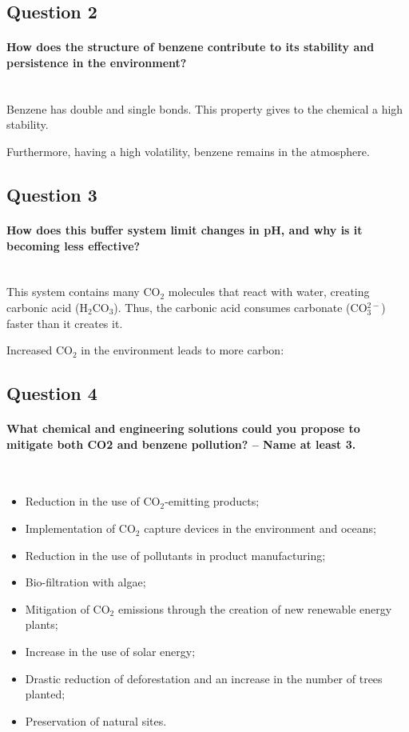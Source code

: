 \documentclass{article}
\newcommand{\figbox}[1]{ 
    \begin{figure}[ht!]        
        \begin{center}            
            \fbox{#1}        
        \end{center}    
    \end{figure}
}
\newcommand{\pph}[1]{\paragraph{#1}\phantom{}\\}
\begin{document}
\subsection{Question 2}
\pph{How does the structure of benzene contribute to its stability and persistence in the environment?}

Benzene has double and single bonds. This property gives to the chemical a high stability.

Furthermore, having a high volatility, benzene remains in the atmosphere.

\newpage
\subsection{Question 3}
\pph{How does this buffer system limit changes in pH, and why is it becoming less effective?}

This system contains many CO$_2$ molecules that react with water, creating carbonic acid
(H$_2$CO$_3$). Thus, the carbonic acid consumes carbonate (CO$_3^{2-}$) faster than it
creates it.

Increased CO$_2$ in the environment leads to more carbon:
\figbox{\schemestart CaCO$_3$\arrow{<->>}Ca$^{2+}$ + CO$_3^{2-}$ \schemestop}

\subsection{Question 4}
\pph{What chemical and engineering solutions could you propose to mitigate both CO2 and benzene
pollution? -- Name at least 3.}

\begin{itemize}
    \item Reduction in the use of CO$_2$-emitting products;
    \item Implementation of CO$_2$ capture devices in the environment and oceans;
    \item Reduction in the use of pollutants in product manufacturing;
    \item Bio-filtration with algae;
    \item Mitigation of CO$_2$ emissions through the creation of new renewable energy plants;
    \item Increase in the use of solar energy;
    \item Drastic reduction of deforestation and an increase in the number of trees planted;
    \item Preservation of natural sites.
\end{itemize}
\end{document}
